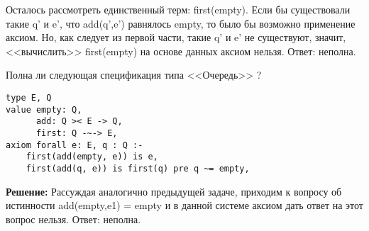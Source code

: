 Осталось рассмотреть единственный терм: first(empty). Если бы существовали такие q' и e', что add(q',e') равнялось empty, то было бы возможно применение аксиом. Но, как следует из первой части, такие q' и e' не существуют, значит, <<вычислить>> first(empty) на основе данных аксиом нельзя. Ответ: неполна.

\z Полна ли следующая спецификация типа <<Очередь>> ?
\begin{lstlisting}
type E, Q
value empty: Q,
      add: Q >< E -> Q,
      first: Q -~-> E,
axiom forall e: E, q : Q :-
    first(add(empty, e)) is e,
    first(add(q, e)) is first(q) pre q ~= empty,
\end{lstlisting}

\textbf{Решение:}
Рассуждая аналогично предыдущей задаче, приходим к вопросу об истинности add(empty,e1) = empty и в данной системе аксиом дать ответ на этот вопрос нельзя. Ответ: неполна.






